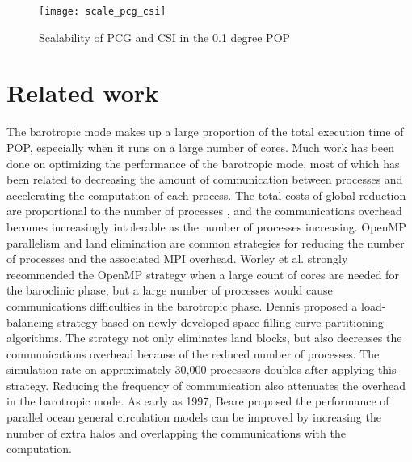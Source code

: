 \begin {figure}
\vspace{-10pt}
\centering
\begin{minipage}{360pt}
\texttt{[image: scale\_pcg\_csi]}
\end{minipage}
\vspace{-10pt}
\caption []{Scalability of PCG and CSI in the 0.1 degree POP \label {fig:scale}}
\vspace{-10pt}
\end {figure}


\section{Related work} \label{se:rel}
The barotropic mode makes up a large proportion of the total execution time of POP, especially when it runs on a large number of cores. Much work has been done on optimizing the performance of the barotropic mode, most of which has been related to decreasing the amount of communication between processes and accelerating the computation of each process. The total costs of global reduction are proportional to the number of processes , and the communications overhead becomes increasingly intolerable as the number of processes increasing. OpenMP parallelism and land elimination are common strategies for reducing the number of processes and the associated MPI overhead. Worley et al. \cite{Worley:2011:PCE:2063384.2063457} strongly recommended the OpenMP strategy when a large count of cores are needed for the baroclinic phase, but a large number of processes would cause communications difficulties in the barotropic phase.
Dennis \cite{dennis2007inverse,dennis2008scaling} proposed a load-balancing strategy based on newly developed space-filling curve partitioning algorithms. The strategy not only eliminates land blocks, but also decreases the communications overhead because of the reduced number of processes.  The simulation rate on approximately 30,000 processors doubles after applying this strategy. Reducing the frequency of communication also attenuates the overhead in the barotropic mode.
As early as 1997,  Beare \cite{beare1997optimisation} proposed the performance of parallel ocean general circulation models can be improved by increasing the number of extra halos and overlapping the communications with the computation. 

